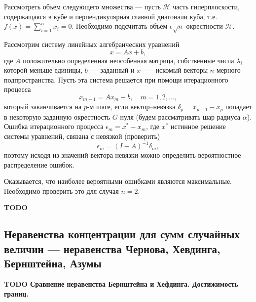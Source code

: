 \begin{remark} 
Рассмотреть объем  следующего множества ---   пусть $\mathcal{H}$ часть гиперплоскости, содержащаяся в кубе и перпендикулярная главной диагонали куба, т.е.  $f(x) =\sum_{i=1}^n x_i = 0$. Необходимо подсчитать объем $\epsilon\sqrt{n}$-окрестности $\mathcal{H}$. 
\end{remark}

\begin{problem}
Рассмотрим систему линейных алгебраических уравнений 
\begin{equation*}
x=Ax+b,
\end{equation*}
где $A$ положительно определенная неособенная матрица, собственные числа $\lambda_i$ которой меньше единицы, $b$~--- заданный и  $x$ ~--- искомый векторы $n$-мерного подпространства. Пусть эта система решается при помощи итерационного процесса 
\begin{equation*}
x_{m+1}= Ax_{m}+b,\quad m=1,2,\dots,
\end{equation*}
 который заканчивается на $p$-м шаге, если вектор--невязка $\delta_p = x_{p+1}-x_{p}$ попадает в некоторую заданную окрестность $G$ нуля (будем рассматривать шар радиуса $\alpha$). 
Ошибка итерационного процесса $\epsilon_m = x^{*} - x_m$, где  $x^{*}$ истинное решение системы уравнений, связана с невязкой  (проверить)
 \begin{equation*}
\epsilon_m = (I-A)^{-1}\delta_m,
\end{equation*}
поэтому  исходя из значений вектора невязки можно определить вероятностное распределение  ошибок. 

Оказывается, что наиболее вероятными ошибками являются максимальные. Необходимо проверить это для случая $n=2$.

\end{problem}
\begin{remark}
\end{remark}

\textbf{
TODO
}



\subsection{Неравенства концентрации для сумм случайных величин ---  неравенства Чернова, Хевдинга, Бернштейна, Азумы}


\textbf{
TODO Сравнение неравенства Бернштейна и Хефдинга.
Достижимость границ.
}


